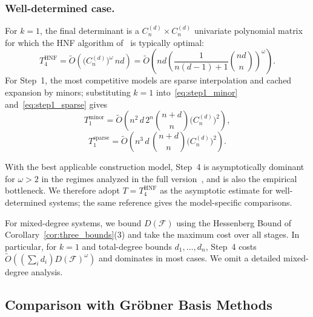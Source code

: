 \subsubsection{Well-determined case.}
For $k=1$, the final determinant is a $C_n^{(d)}\times C_n^{(d)}$ univariate polynomial matrix for which the HNF algorithm of~\cite{DBLP:journals/jc/LabahnNZ17} is typically optimal:
\begin{equation}
	T_{4}^{\mathrm{HNF}} = \widetilde{O}\!\left(\bigl(C_n^{(d)}\bigr)^{\omega}\,nd\right)
	= \widetilde{O}\!\left(nd\left(\frac{1}{n(d-1)+1}\binom{nd}{n}\right)^{\omega}\right).
	\label{eq:dixon_complexity_well}
\end{equation}
For Step~1, the most competitive models are sparse interpolation and cached expansion by minors; substituting $k=1$ into~\eqref{eq:step1_minor} and~\eqref{eq:step1_sparse} gives
\begin{equation}
	T_{1}^{\mathrm{minor}} = \widetilde{O}\!\left(n^2\,d\,2^n\binom{n+d}{n}\bigl(C_n^{(d)}\bigr)^2\right),
	\label{eq:dixon_complexity_well_step1_minor}
\end{equation}
\begin{equation}
	T_{1}^{\mathrm{sparse}} = \widetilde{O}\!\left(n^3\,d\,\binom{n+d}{n}\bigl(C_n^{(d)}\bigr)^2\right).
	\label{eq:dixon_complexity_well_step1_sparse}
\end{equation}

With the best applicable construction model, Step~4 is asymptotically dominant for $\omega>2$ in the regimes analyzed in the full version~\cite{cryptoeprint:2026/1969}, and is also the empirical bottleneck. We therefore adopt $T=T_{4}^{\mathrm{HNF}}$ as the asymptotic estimate for well-determined systems; the same reference gives the model-specific comparisons.

\begin{remark}\label{rem:mixed_degree_complexity}
For mixed-degree systems, we bound $D(\mathcal F)$
using the Hessenberg Bound of Corollary~\ref{cor:three_bounds}(3)
and take the maximum cost over all stages.
In particular, for $k=1$ and total-degree bounds $d_1,\ldots,d_n$,
Step~4 costs $\widetilde{O}((\sum_i d_i)D(\mathcal F)^\omega)$
and dominates in most cases.
We omit a detailed mixed-degree analysis.
\end{remark}

\subsection{Comparison with Gr\"obner Basis Methods}\label{Subsection:Other_Comparison}

